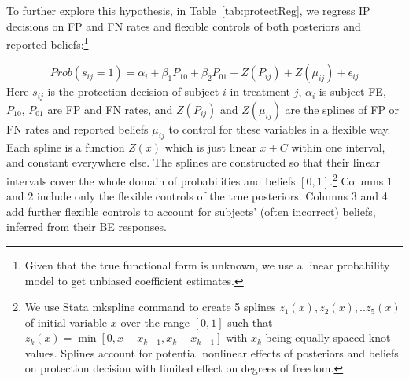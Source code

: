 \documentclass[12pt,a4paper]{article}
\begin{document}
\begin{table}[htbp]\centering 
\caption{Updating Errors in BE Task} 
\label{updateErrorReg}
\end{table}





To further explore this hypothesis, in Table~\ref{tab:protectReg}, we regress IP decisions on FP and FN rates and flexible controls of both posteriors and reported beliefs:\footnote{Given that the true functional form is unknown, we use a linear probability model to get unbiased coefficient estimates.}

	\[Prob(s_{ij}=1)=\alpha_i+\beta_1 P_{10}+\beta_2 P_{01} +Z(P_{ij})+Z(\mu_{ij})+\epsilon_{ij} \]
Here $s_{ij}$ is the protection decision of subject $i$ in treatment $j$, $\alpha_i$ is subject FE, $P_{10}$, $P_{01}$ are FP and FN rates, and $Z(P_{ij})$ and $Z(\mu_{ij})$ are the splines of FP or FN rates  and reported beliefs $\mu_{ij}$ to control for these variables in a flexible way. Each spline is a function $Z(x)$ which is just linear $x+C$ within one interval, and constant everywhere else. The splines are constructed so that their linear intervals cover the whole domain of probabilities and beliefs $[0,1]$.\footnote{We use Stata mkspline command to create 5 splines $z_1(x),z_2(x),..z_5(x)$ of initial variable $x$ over the range $[0,1]$ such that $z_k(x)=\min[0,x-x_{k-1},x_k-x_{k-1}]$ with $x_k$ being equally spaced knot values. Splines account for potential nonlinear effects of posteriors and beliefs on protection decision with limited effect on degrees of freedom.} Columns 1 and 2 include only the flexible controls of the true posteriors. Columns 3 and 4 add further flexible controls to account for subjects' (often incorrect) beliefs, inferred from their BE responses.
\end{document}
